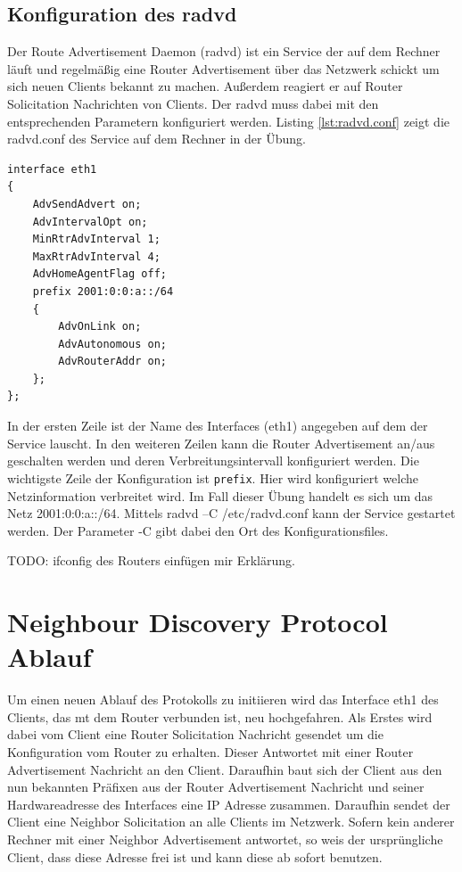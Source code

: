 \documentclass[a4paper,12pt]{article} %
\begin{document}
\subsection{Konfiguration des radvd}
Der Route Advertisement Daemon (radvd) ist ein Service der auf dem Rechner läuft und regelmäßig eine Router Advertisement über das Netzwerk schickt um sich neuen Clients bekannt zu machen. Außerdem reagiert er auf Router Solicitation Nachrichten von Clients. Der radvd muss dabei mit den entsprechenden Parametern konfiguriert werden. Listing \ref{lst:radvd.conf} zeigt die radvd.conf des Service auf dem Rechner in der Übung.
\begin{lstlisting}[style=code,caption={radvd.conf},label=lst:radvd.conf]
interface eth1
{
	AdvSendAdvert on;
	AdvIntervalOpt on;
	MinRtrAdvInterval 1;
	MaxRtrAdvInterval 4;
	AdvHomeAgentFlag off;
	prefix 2001:0:0:a::/64
	{
		AdvOnLink on;
		AdvAutonomous on;
		AdvRouterAddr on;
	};
};
\end{lstlisting}
In der ersten Zeile ist der Name des Interfaces (eth1) angegeben auf dem der Service lauscht. In den weiteren Zeilen kann die Router Advertisement an/aus geschalten werden und deren Verbreitungsintervall konfiguriert werden. Die wichtigste Zeile der Konfiguration ist \verb!prefix!. Hier wird konfiguriert welche Netzinformation verbreitet wird. Im Fall dieser Übung handelt es sich um das Netz 2001:0:0:a::/64.
Mittels radvd –C /etc/radvd.conf kann der Service gestartet werden. Der Parameter -C gibt dabei den Ort des Konfigurationsfiles.

TODO: ifconfig des Routers einfügen mir Erklärung.

\section{Neighbour Discovery Protocol Ablauf}
Um einen neuen Ablauf des Protokolls zu initiieren wird das Interface eth1 des Clients, das mt dem Router verbunden ist, neu hochgefahren. Als Erstes wird dabei vom Client eine Router Solicitation Nachricht gesendet um die Konfiguration vom Router zu erhalten. Dieser Antwortet mit einer Router Advertisement Nachricht an den Client. Daraufhin baut sich der Client aus den nun bekannten Präfixen aus der Router Advertisement Nachricht und seiner Hardwareadresse des Interfaces eine IP Adresse zusammen. Daraufhin sendet der Client eine Neighbor Solicitation an alle Clients im Netzwerk. Sofern kein anderer Rechner mit einer Neighbor Advertisement antwortet, so weis der ursprüngliche Client, dass diese Adresse frei ist und kann diese ab sofort benutzen.
\end{document}
